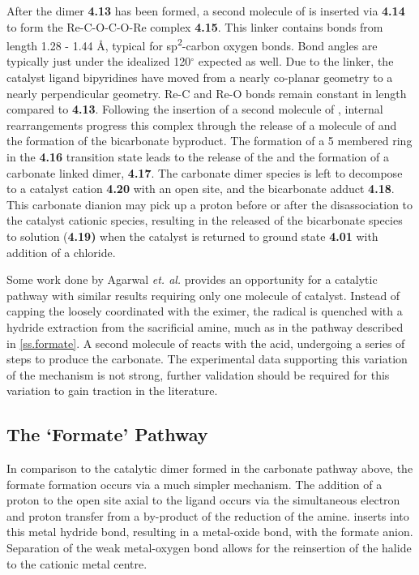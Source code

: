 After the dimer \textbf{4.13} has been formed, a second molecule of  is inserted via \textbf{4.14} to form the Re-C-O-C-O-Re complex \textbf{4.15}. This linker contains bonds from length 1.28 - 1.44 \r{A}, typical for sp\textsuperscript{2}-carbon oxygen bonds. Bond angles are typically just under the idealized 120$^\circ$ expected as well. Due to the linker, the catalyst ligand bipyridines have moved from a nearly co-planar geometry to a nearly perpendicular geometry. Re-C and Re-O bonds remain constant in length compared to \textbf{4.13}. Following the insertion of a second molecule of , internal rearrangements progress this complex through the release of a molecule of  and the formation of the bicarbonate byproduct. The formation of a 5 membered ring in the \textbf{4.16} transition state leads to the release of the  and the formation of a carbonate linked dimer, \textbf{4.17}. The carbonate dimer species is left to decompose to a catalyst cation \textbf{4.20} with an open site, and the bicarbonate adduct \textbf{4.18}. This carbonate dianion may pick up a proton before or after the disassociation to the catalyst cationic species, resulting in the released of the bicarbonate species to solution (\textbf{4.19)} when the catalyst is returned to ground state \textbf{4.01} with addition of a chloride. 

Some work done by Agarwal \textit{et. al.} provides an opportunity for a catalytic pathway with similar results requiring only one molecule of catalyst\autocite{agarwal2012a}. Instead of capping the loosely coordinated  with the eximer, the radical is quenched with a hydride extraction from the sacrificial amine, much as in the pathway described in \autoref{ss.formate}. A second molecule of  reacts with the acid, undergoing a series of steps to produce the carbonate. The experimental data supporting this variation of the mechanism is not strong, further validation should be required for this variation to gain traction in the literature. 

\FloatBarrier

\subsection{The `Formate' Pathway}\label{ss.formate}
In comparison to the catalytic dimer formed in the carbonate pathway above, the formate formation occurs via a much simpler mechanism. The addition of a proton to the open site axial to the ligand occurs via the simultaneous electron and proton transfer from a by-product of the reduction of the amine.  inserts into this metal hydride bond, resulting in a metal-oxide bond, with the formate anion. Separation of the weak metal-oxygen bond allows for the reinsertion of the halide to the cationic metal centre. 

